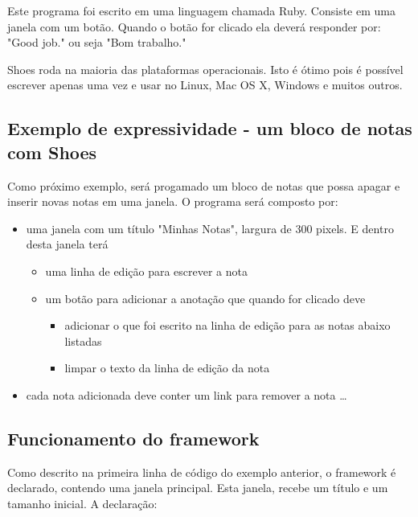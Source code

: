 \documentclass[espaco=simples,appendix=Name]{abnt}
\begin{document}
Este programa foi escrito em uma linguagem chamada Ruby. Consiste em uma janela com um botão. Quando o botão for clicado ela deverá responder por: "Good job." ou seja "Bom trabalho."

Shoes roda na maioria das plataformas operacionais. Isto é ótimo pois é possível escrever apenas uma vez e usar no Linux, Mac OS X, Windows e muitos outros.


\subsection{ Exemplo de expressividade - um bloco de notas com Shoes }

Como próximo exemplo, será progamado um bloco de notas que possa apagar e inserir novas notas em uma janela. O programa será composto por:
\begin{itemize} 
  \item uma janela com um título "Minhas Notas", largura de 300 pixels. E dentro desta janela terá 
  \begin{itemize} 
    \item uma linha de edição para escrever a nota
    \item um botão para adicionar a anotação que quando for clicado deve 
    \begin{itemize} 
      \item adicionar o que foi escrito na linha de edição para as notas abaixo listadas
      \item limpar o texto da linha de edição da nota
    \end{itemize} 
  \end{itemize} 
  \item cada nota adicionada deve conter um link para remover a nota \ldots
\end{itemize} 


\subsection { Funcionamento do framework }

Como descrito na primeira linha de código do exemplo anterior, o framework é declarado, contendo uma janela principal. Esta janela, recebe um título e um tamanho inicial.
A declaração:

 
\end{document}
